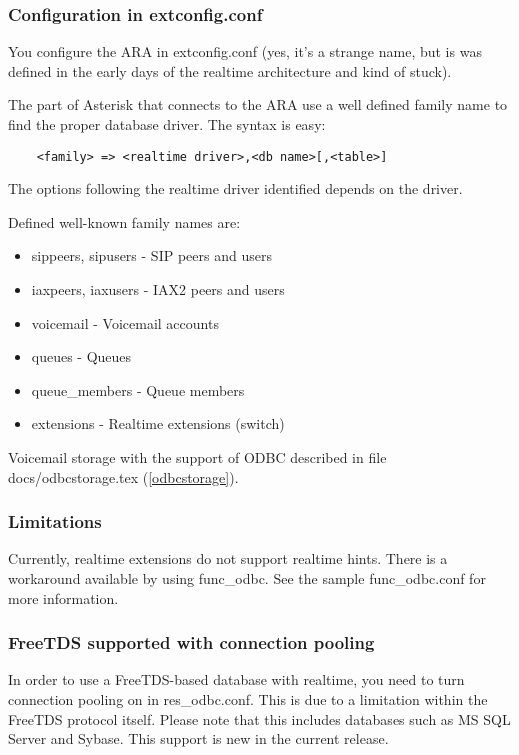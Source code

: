 \subsubsection{Configuration in extconfig.conf}

You configure the ARA in extconfig.conf (yes, it's a strange name, but
is was defined in the early days of the realtime architecture and kind
of stuck).

The part of Asterisk that connects to the ARA use a well defined family
name to find the proper database driver. The syntax is easy:

\begin{verbatim}
    <family> => <realtime driver>,<db name>[,<table>]
\end{verbatim}

The options following the realtime driver identified depends on the
driver.

Defined well-known family names are:

\begin{itemize}
  \item sippeers, sipusers - SIP peers and users
  \item iaxpeers, iaxusers - IAX2 peers and users
  \item voicemail - Voicemail accounts 
  \item queues - Queues
  \item queue\_members - Queue members
  \item extensions - Realtime extensions (switch)
\end{itemize}

Voicemail storage with the support of ODBC described in file 
docs/odbcstorage.tex (\ref{odbcstorage}).

\subsubsection{Limitations}

Currently, realtime extensions do not support realtime hints.  There is
a workaround available by using func\_odbc.  See the sample func\_odbc.conf
for more information.

\subsubsection{FreeTDS supported with connection pooling}

In order to use a FreeTDS-based database with realtime, you need to turn
connection pooling on in res\_odbc.conf.  This is due to a limitation within
the FreeTDS protocol itself.  Please note that this includes databases such
as MS SQL Server and Sybase.  This support is new in the current release.
